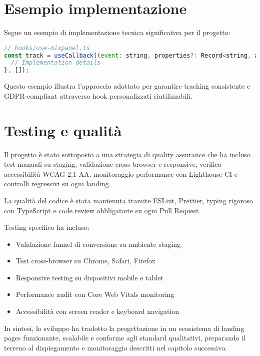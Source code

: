\section{Esempio implementazione}
Segue un esempio di implementazione tecnica significativa per il progetto:

\begin{lstlisting}[language=JavaScript, caption=Custom hook per tracking]
// hooks/use-mixpanel.ts
const track = useCallback((event: string, properties?: Record<string, any>) => {
  // Implementation details
}, []);
\end{lstlisting}

Questo esempio illustra l'approccio adottato per garantire tracking consistente 
e GDPR-compliant attraverso hook personalizzati riutilizzabili.

\section{Testing e qualità}
Il progetto è stato sottoposto a una strategia di quality assurance che ha
incluso test manuali su staging, validazione cross-browser e responsive,
verifica accessibilità WCAG 2.1 AA, monitoraggio performance con Lighthouse CI e
controlli regressivi su ogni landing.  

La qualità del codice è stata mantenuta tramite ESLint, Prettier, typing
rigoroso con TypeScript e code review obbligatorie su ogni Pull Request.

Testing specifico ha incluso:
\begin{itemize}
  \item Validazione funnel di conversione su ambiente staging
  \item Test cross-browser su Chrome, Safari, Firefox
  \item Responsive testing su dispositivi mobile e tablet
  \item Performance audit con Core Web Vitals monitoring
  \item Accessibilità con screen reader e keyboard navigation
\end{itemize}

\bigskip
In sintesi, lo sviluppo ha tradotto la progettazione in un ecosistema di landing
pages funzionante, scalabile e conforme agli standard qualitativi, preparando il
terreno al dispiegamento e monitoraggio descritti nel capitolo successivo.